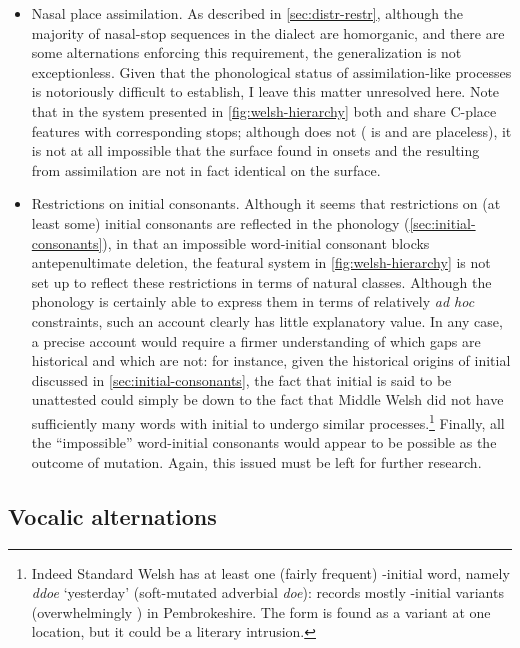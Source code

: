 \begin{itemize}
\item Nasal place assimilation. As described in \cref{sec:distr-restr}, although the majority of nasal\hyp stop sequences in the dialect are homorganic, and there are some alternations enforcing this requirement, the generalization is not exceptionless. Given that the phonological status of assimilation\hyp like processes is notoriously difficult to establish, I leave this matter unresolved here. Note that in the system presented in \cref{fig:welsh-hierarchy} both \ipa{[m]} and \ipa{[n]} share C-place features with corresponding stops; although \ipa{[ŋ]} does not (\ipa{[ŋ]} is  and \ipa{[k~ɡ]} are placeless), it is not at all impossible that the surface \ipa{[ŋ]} found in onsets and the \ipa{[ŋ]} resulting from assimilation are not in fact identical on the surface.
\item Restrictions on initial consonants. Although it seems that restrictions on (at least some) initial consonants are reflected in the phonology (\cref{sec:initial-consonants}), in that an impossible word\hyp initial consonant blocks antepenultimate deletion, the featural system in \cref{fig:welsh-hierarchy} is not set up to reflect these restrictions in terms of natural classes. Although the phonology is certainly able to express them in terms of relatively \emph{ad hoc} constraints, such an account clearly has little explanatory value. In any case, a precise account would require a firmer understanding of which gaps are historical and which are not: for instance, given the historical origins of initial \ipa{[v]} discussed in \cref{sec:initial-consonants}, the fact that initial \ipa{[ð]} is said to be unattested could simply be down to the fact that Middle Welsh did not have sufficiently many words with initial \ipa{[d]} to undergo similar processes.\footnote{Indeed Standard Welsh has at least one (fairly frequent) \ipa{[ð]}\hyp initial word, namely \emph{ddoe} `yesterday' (soft\hyp mutated adverbial \emph{doe}): \citet{thomas00:_welsh} records mostly \ipa{[d]}\hyp initial variants (overwhelmingly \ipa{[ˈduːe]}) in Pembrokeshire. The form \ipa{[ˈðoː]} is found as a variant at one location, but it could be a literary intrusion.} Finally, all the \enquote{impossible} word\hyp initial consonants would appear to be possible as the outcome of mutation. Again, this issued must be left for further research.
\end{itemize}

\subsection{Vocalic alternations}
\label{sec:vocalic-alternations-1}

